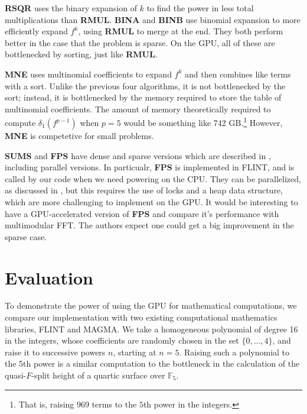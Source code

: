 \textbf{RSQR} uses the binary expansion of \(k\) to find the power in less
total multiplications than \textbf{RMUL}.
\textbf{BINA} and \textbf{BINB} use binomial expansion to more efficiently 
expand \(f^{k}\), using \textbf{RMUL} to merge at the end.
They both perform better in the case that the problem is sparse.
On the GPU, all of these are bottlenecked by sorting, just like
\textbf{RMUL}.

\textbf{MNE} uses multinomial coefficients to expand \(f^{k}\) 
and then combines like terms with a sort. 
Unlike the previous four algorithms, it is not bottlenecked by the sort;
instead, it is bottlenecked by the memory required to store the table of
multinomial coefficients. 
The amount of memory theoretically required to compute 
$\delta_1(f ^ {p - 1})$ when \(p=5\) 
would be something like 742 GB.\footnote{
	That is, raising 
    $969$ terms to the $5$th power
	in the integers.
}
However, \textbf{MNE} is competetive for small problems.

\textbf{SUMS} and \textbf{FPS} have dense and sparse versions which are described in 
\cite{monagan-2012-sparse-powering}, including parallel versions.
In particualr, \textbf{FPS} is implemented in FLINT, and is called by our
code when we need powering on the CPU.
They can be parallelized, as discussed in \cite{monagan-2012-sparse-powering},
but this requires the use of locks and a heap data structure,
which are more challenging to implement on the GPU.
It would be interesting to have a GPU-accelerated version of
\textbf{FPS} and compare it's performance with 
multimodular FFT.
The authors expect one could get a big improvement in the sparse case.

\section{Evaluation}

To demonstrate the power of using the GPU for mathematical computations, 
we compare our implementation
with two existing computational mathematics libraries, FLINT
and MAGMA.
We take a homogeneous polynomial of degree 16 in the integers,
whose coefficients are randomly chosen in the set 
\(\{0, \ldots, 4\}\), and raise it to successive powers \(n\),
starting at \(n=5\).
Raising such a polynomial to the 5th power is a similar 
computation to the bottleneck in the calculation of the
quasi-\(F\)-split height of a quartic surface over \(\mathbb{F}_{5}\).

